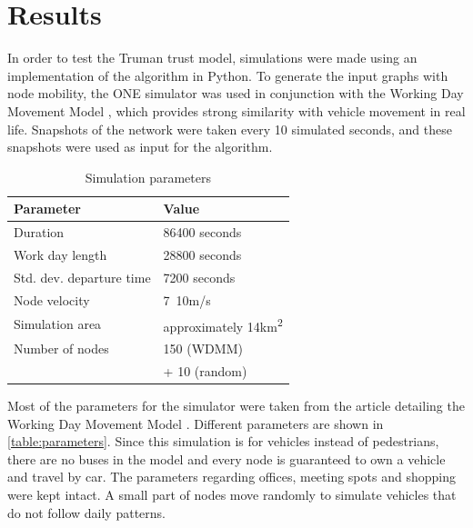 \documentclass[conference]{IEEEtran}
\begin{document}
\section{Results}
\label{section:results}

In order to test the Truman trust model, simulations were made using an implementation of the algorithm in Python.
To generate the input graphs with node mobility, the ONE simulator \cite{keranen2009one} was used in conjunction with the Working Day Movement Model \cite{ekman2008working}, which provides strong similarity with vehicle movement in real life.
Snapshots of the network were taken every 10 simulated seconds, and these snapshots were used as input for the algorithm.

\begin{table}[h!]
\caption{Simulation parameters}
\label{table:parameters}
\centering
\begin{tabular}{|p{3cm}||p{3cm}|}
 \hline
 \textbf{Parameter}	& \textbf{Value} \\
 \hline
 \hline
 Duration 			& 86400 seconds \\
 \hline
 Work day length 	& 28800 seconds \\
 \hline
 Std. dev. departure time & 7200 seconds \\
 \hline
 Node velocity 		& 7~10m/s \\
 \hline
 Simulation area	& approximately 14km\textsuperscript{2} \\
 \hline
 Number of nodes 	& 150 (WDMM) \\
  					& + 10 (random) \\
 \hline
\end{tabular}
\end{table}

Most of the parameters for the simulator were taken from the article detailing the Working Day Movement Model \cite{ekman2008working}.
Different parameters are shown in \autoref{table:parameters}.
Since this simulation is for vehicles instead of pedestrians, there are no buses in the model and every node is guaranteed to own a vehicle and travel by car.
The parameters regarding offices, meeting spots and shopping were kept intact.
A small part of nodes move randomly to simulate vehicles that do not follow daily patterns.
\end{document}

